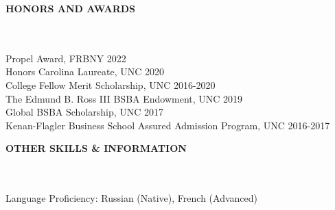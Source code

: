 \documentclass[a4paper]{article}
\newcommand{\lineunder} {
    \vspace*{-8pt} \\
    \hspace*{-18pt} \hrulefill \\
}
\newcommand{\header} [1] {
    {\hspace*{-18pt}\vspace*{1pt} \textbf{\MakeUppercase{#1}}}
    \lineunder
}
\begin{document}

\header{Honors and Awards}
\vspace{1mm}
Propel Award, FRBNY \hfill 2022 \\
Honors Carolina Laureate, UNC \hfill 2020 \\
College Fellow Merit Scholarship, UNC \hfill 2016-2020\\
The Edmund B. Ross III BSBA Endowment, UNC \hfill 2019\\
Global BSBA Scholarship, UNC  \hfill 2017\\
Kenan-Flagler Business School Assured Admission Program, UNC \hfill 2016-2017\\
\vspace{5mm}

\header{Other Skills \& Information}
\vspace{1mm}
	Language Proficiency: Russian (Native), French (Advanced) \\
\end{document}
